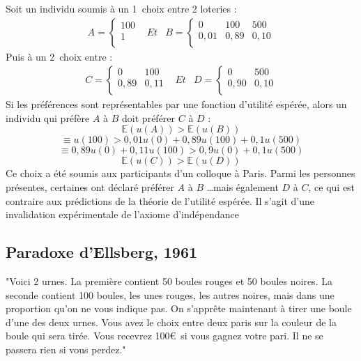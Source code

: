 \documentclass[a4paper, 12pt]{report}
\begin{document}
Soit un individu soumis à un 1\ier~choix entre 2 loteries :
$$
\begin{matrix}
	A= \left\{\begin{matrix}
		100 \\
		1 \\
	\end{matrix}\right. & Et & 
	B = \left\{\begin{matrix}
		0 & 100 & 500 \\
		0,01 & 0,89 & 0,10 \\
	\end{matrix}\right.
\end{matrix}
$$
Puis à un 2\ieme~choix entre :
$$
\begin{matrix}
	C= \left\{\begin{matrix}
		0 & 100 \\
		0,89 & 0,11 \\
	\end{matrix}\right. & Et & 
	D = \left\{\begin{matrix}
		0 & 500  \\
		0,90 & 0,10 \\
	\end{matrix}\right.
\end{matrix}
$$
Si les préférences sont représentables par une fonction d'utilité espérée, alors un individu qui préfère $A$ à $B$ doit préférer $C$ à $D$ :
$$
\mathbb{E}\left( u(A) \right)>\mathbb{E}\left( u(B) \right)
$$
$$
\equiv u(100)> 0,01 u(0)+0,89u(100)+0,1u(500)
$$
$$
\equiv 0,89u(0)+0,11u(100)>0,9u(0)+0,1u(500)
$$
$$
\mathbb{E}\left( u(C) \right)>\mathbb{E}\left( u(D) \right)
$$
Ce choix a été soumis aux participants d'un colloque à Paris. Parmi les personnes présentes, certaines ont déclaré préférer $A$ à $B$ …mais également $D$ à $C$, ce qui est contraire aux prédictions de la théorie de
l'utilité espérée. Il s'agit d'une invalidation expérimentale de l'axiome
d'indépendance

\subsection{Paradoxe d'Ellsberg, 1961}

"Voici 2 urnes. La première contient 50 boules rouges et 50 boules
noires. La seconde contient 100 boules, les unes rouges, les autres
noires, mais dans une proportion qu'on ne vous indique pas. On
s'apprête maintenant à tirer une boule d'une des deux urnes. Vous
avez le choix entre deux paris sur la couleur de la boule qui sera tirée.
Vous recevrez 100\euro~si vous gagnez votre pari. Il ne se passera rien si
vous perdez."
\end{document}
